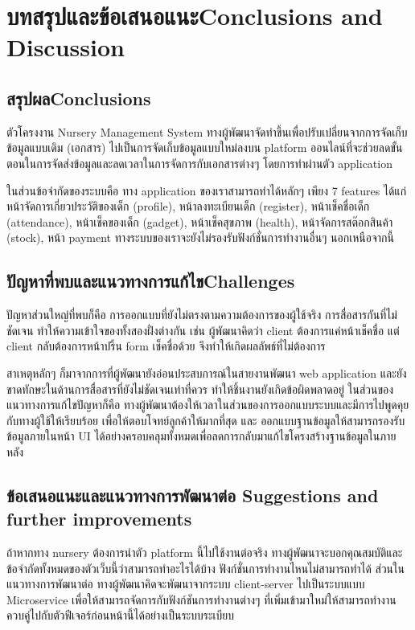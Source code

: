 \chapter{\ifcpe บทสรุปและข้อเสนอแนะ\else Conclusions and Discussion\fi}

\section{\ifcpe สรุปผล\else Conclusions\fi}

ตัวโครงงาน  Nursery Management System  ทางผู้พัฒนาจัดทำขึ้นเพื่อปรับเปลี่ยนจากการจัดเก็บข้อมูลแบบเดิม (เอกสาร) ไปเป็นการจัดเก็บข้อมูลแบบใหม่ลงบน platform ออนไลน์ที่จะช่วยลดขั้นตอนในการจัดส่งข้อมูลและลดเวลาในการจัดการกับเอกสารต่างๆ โดยการทำผ่านตัว application 

ในส่วนข้อจำกัดของระบบคือ ทาง application ของเราสามารถทำได้หลักๆ เพียง 7 features ได้แก่ หน้าจัดการเกี่ยวประวัติของเด็ก (profile), หน้าลงทะเบียนเด็ก (register), หน้าเช็คชื่อเด็ก (attendance), หน้าเช็คของเด็ก (gadget), หน้าเช็คสุขภาพ (health), หน้าจัดการสต๊อกสินค้า (stock), หน้า payment ทางระบบของเราจะยังไม่รองรับฟังก์ชั่นการทำงานอื่นๆ นอกเหนือจากนี้

\section{\ifcpe ปัญหาที่พบและแนวทางการแก้ไข\else Challenges\fi}

ปัญหาส่วนใหญ่ที่พบก็คือ การออกแบบที่ยังไม่ตรงตามความต้องการของผู้ใช้จริง  การสื่อสารกันที่ไม่ชัดเจน ทำให้ความเข้าใจของทั้งสองฝั่งต่างกัน เช่น ผู้พัฒนาคิดว่า client ต้องการแค่หน้าเช็คชื่อ
แต่ client กลับต้องการหน้าปริ้น form เช็คชื่อด้วย จึงทำให้เกิดผลลัพธ์ที่ไม่ต้องการ  

สาเหตุหลักๆ ก็มาจากการที่ผู้พัฒนายังอ่อนประสบการณ์ในสายงานพัฒนา web application และยังขาดทักษะในด้านการสื่อสารที่ยังไม่ชัดเจนเท่าที่ควร ทำให้ชิ้นงานยังเกิดข้อผิดพลาดอยู่
ในส่วนของแนวทางการแก้ไขปัญหาก็คือ ทางผู้พัฒนาต้องให้เวลาในส่วนของการออกแบบระบบและมีการไปพูดคุยกับทางผู้ใช้ให้เรียบร้อย เพื่อให้ตอบโจทย์ลูกค้าให้มากที่สุด และ ออกแบบฐานข้อมูลให้สามารถรองรับข้อมูลภายในหน้า UI ได้อย่างครอบคลุมทั้งหมดเพื่อลดการกลับมาแก้ไขโครงสร้างฐานข้อมูลในภายหลัง
\section{\ifcpe%
ข้อเสนอแนะและแนวทางการพัฒนาต่อ
\else%
Suggestions and further improvements
\fi
}

ถ้าหากทาง nursery ต้องการนำตัว platform นี้ไปใช้งานต่อจริง ทางผู้พัฒนาจะบอกคุณสมบัติและข้อจำกัดทั้งหมดของตัวเว็บนี้ว่าสามารถทำอะไรได้บ้าง ฟังก์ชั่นการทำงานไหนไม่สามารถทำได้
ส่วนในแนวทางการพัฒนาต่อ  ทางผู้พัฒนาคิดจะพัฒนาจากระบบ client-server ไปเป็นระบบแบบ Microservice เพื่อให้สามารถจัดการกับฟังก์ชันการทำงานต่างๆ ที่เพิ่มเข้ามาใหม่ให้สามารถทำงานควบคู่ไปกับตัวฟีเจอร์ก่อนหน้านี้ได้อย่างเป็นระบบระเบียบ
